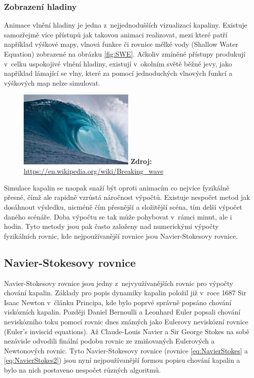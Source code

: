 \subsubsection{Zobrazení hladiny}
Animace vlnění hladiny je jedna z~nejjednodušších vizualizací kapaliny. Existuje samozřejmě více přístupů jak takovou animaci realizovat, mezi které patří například výškové mapy, vlnová funkce či rovnice mělké vody (Shallow Water Equation) zobrazené na obrázku \ref{fig:SWE}. Ačkoliv zmíněné přístupy produkují v~celku uspokojivé vlnění hladiny, existují v~okolním světě běžné jevy, jako například lámající se vlny, které za pomocí jednoduchých vlnových funkcí a výškových map nelze simulovat. \cite{Medvecky-Heretik2018thesis}

\begin{figure}[hbt]
	\centering
	\captionsetup{justification=centering}
	\includegraphics[width=0.5\textwidth]{obrazky-figures/Large_breaking_wave.jpg}
	\textbf{Zdroj: } \url{https://en.wikipedia.org/wiki/Breaking_wave}
	\label{keepCalm}
\end{figure}

Simulace kapalin se naopak snaží být oproti animacím co nejvíce fyzikálně přesné, čímž ale rapidně vzrůstá náročnost výpočtů. Existuje nespočet metod jak dosáhnout výsledku, nicméně čím přesnější a složitější scéna, tím delší výpočet daného scénáře. Doba výpočtu se tak může pohybovat v~rámci minut, ale i hodin. Tyto metody jsou pak často založeny nad numerickými výpočty fyzikálních rovnic, kde nejpoužívanější rovnice jsou Navier-Stokesovy rovnice.

\subsection{Navier-Stokesovy rovnice}
Navier-Stokesovy rovnice jsou jedny z~nejvyužívanějších rovnic pro výpočty chování kapalin. Základy pro popis dynamiky kapalin položil již v~roce 1687 Sir Isaac Newton v~článku Principa, kde bylo poprvé správně popsáno chování viskózních kapalin. Později Daniel Bernoulli a Leonhard Euler popsali chování neviskózního toku pomocí rovnic dnes známých jako Eulerovy neviskózní rovnice (Euler’s inviscid equations). Až Claude-Louis Navier a Sir George Stokes na sobě nezávisle odvodili finální podobu rovnic ze zmiňovaných Eulerových a Newtonových rovnic. Tyto Navier-Stokesovy rovnice (rovnice \ref{eq:NavierStokes} a \ref{eq:NavierStokes2})  jsou nyní nejpoužívanější formou popisu chování kapalin a bylo na nich postaveno nespočet různých algoritmů. \cite{simscale_2020}

